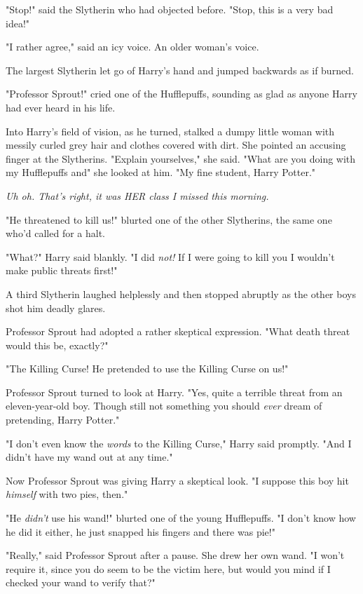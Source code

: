 "Stop!" said the Slytherin who had objected before. "Stop, this is a very bad
idea!"

"I rather agree," said an icy voice. An older woman's voice.

The largest Slytherin let go of Harry's hand and jumped backwards as if burned.

"Professor Sprout!" cried one of the Hufflepuffs, sounding as glad as anyone
Harry had ever heard in his life.

Into Harry's field of vision, as he turned, stalked a dumpy little woman with
messily curled grey hair and clothes covered with dirt. She pointed an accusing
finger at the Slytherins. "Explain yourselves," she said. "What are you doing
with my Hufflepuffs and{\el}" she looked at him. "My fine student, Harry
Potter."

\emph{Uh oh. That's right, it was HER class I missed this morning.}

"He threatened to kill us!" blurted one of the other Slytherins, the same one
who'd called for a halt.

"What?" Harry said blankly. "I did \emph{not!} If I were going to kill you I
wouldn't make public threats first!"

A third Slytherin laughed helplessly and then stopped abruptly as the other
boys shot him deadly glares.

Professor Sprout had adopted a rather skeptical expression. "What death threat
would this be, exactly?"

"The Killing Curse! He pretended to use the Killing Curse on us!"

Professor Sprout turned to look at Harry. "Yes, quite a terrible threat from an
eleven-year-old boy. Though still not something you should \emph{ever} dream of
pretending, Harry Potter."

"I don't even know the \emph{words} to the Killing Curse," Harry said promptly.
"And I didn't have my wand out at any time."

Now Professor Sprout was giving Harry a skeptical look. "I suppose this boy hit
\emph{himself} with two pies, then."

"He \emph{didn't} use his wand!" blurted one of the young Hufflepuffs. "I don't
know how he did it either, he just snapped his fingers and there was pie!"

"Really," said Professor Sprout after a pause. She drew her own wand. "I won't
require it, since you do seem to be the victim here, but would you mind if I
checked your wand to verify that?"

